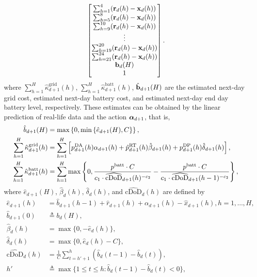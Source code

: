 {\begin{equation}
\begin{bmatrix}
        \sum_{h=1}^4({\mathbf r}_d(h)-{\mathbf x}_d(h)) \\
        \sum_{h=5}^8({\mathbf r}_d(h)-{\mathbf x}_d(h)) \\
        \sum_{h=9}^{10}({\mathbf r}_d(h)-{\mathbf x}_d(h)) \\
        \vdots\\
        \sum_{h=19}^{20}({\mathbf r}_d(h)-{\mathbf x}_d(h)) \\
        \sum_{h=21}^{24}({\mathbf r}_d(h)-{\mathbf x}_d(h)) \\
        {\mathbf b}_{d}(H) \\
        1
    \end{bmatrix}.
\end{equation}
where $\sum_{h=1}^H\hat\kappa^\text{grid}_{d+1}(h)$, $\sum_{h=1}^H\hat\kappa^\text{batt}_{d+1}(h)$, $\hat{{\mathbf b}}_{d+1}(H)$ are the estimated next-day grid cost, estimated next-day battery cost, and estimated next-day end day battery level, respectively. These estimates can be obtained by the linear prediction of real-life data and the action $\boldsymbol{\alpha}_{d+1}$, that is,
\begin{align}
    \hat b_{d+1}(H) &= \max\left\{0,\min\left\{\hat e_{d+1}(H),C\right\}\right\},\\
    \sum_{h=1}^H\hat\kappa^\text{grid}_{d+1}(h) &= \sum_{h=1}^H\left[p^{\text{DA}}_{d+1}(h)\alpha_{d+1}(h)+\hat p^{\text{RT}}_{d+1}(h)\hat\beta_{d+1}(h)+p^{\text{DP}}_{d+1}(h)\hat\delta_{d+1}(h)\right],\\
    \sum_{h=1}^H\hat\kappa^\text{batt}_{d+1}(h) &= \sum_{h=1}^H\max\left\{0, \frac{p^\text{batt}\cdot C}{c_1\cdot\widehat{\text{cDoD}}_{d+1}(h)^{-c_2}}-\frac{p^\text{batt}\cdot C}{c_1\cdot\widehat{\text{cDoD}}_{d+1}(h-1)^{-c_2}}\right\},
\end{align}
where $\hat e_{d+1}(H)$, $\hat\beta_d(h)$, $\hat\delta_d(h)$, and $\widehat{\text{cDoD}}_d(h)$ are defined by
\begin{align*}
    \hat e_{d+1}(h) &= \hat b_{d+1}\left(h-1\right) + \hat r_{d+1}(h) + \alpha_{d+1}(h) - \hat x_{d+1}(h), h = 1,\ldots,H, \\
    \hat b_{d+1}(0) &\triangleq b_d(H), \\
    \hat\beta_d(h) &= \max\{0,-\hat e_d(h)\}, \\
    \hat\delta_d(h) &= \max\{0,\hat e_d(h)-C\}, \\
    \widehat{\text{cDoD}}_d(h) &= \frac{1}{C}\sum_{t=h'+1}^{h}(\hat b_d(t-1)-\hat b_d(t)), \\
    h' &\triangleq \max\{1\leq t\leq h:\hat b_{d}(t-1)-\hat b_{d}(t)<0\},
\end{align*}
}
